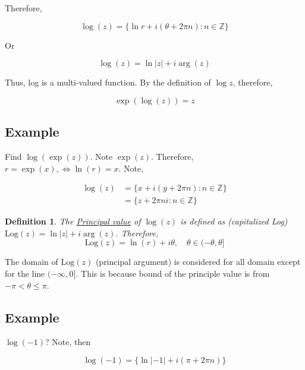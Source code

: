 \documentclass{article}
\newtheorem{definition}[theorem]{Definition}
\newtheorem{one minute paper}[theorem]{One Minute Paper}
\begin{document}
Therefore, 

\begin{equation}
    \log(z) = \{\ln r + i(\theta + 2\pi n) : n \in \mathbb{Z}\}
\end{equation}

Or 

\begin{equation}
    \log(z) = \ln|z| + i\arg(z)
\end{equation}

Thus, log is a multi-valued function. By the definition of $\log z$, therefore, 

\begin{equation}
    \exp(\log(z)) = z 
\end{equation}

\subsection*{Example}

Find $\log(\exp(z))$. Note $\exp(z)$. Therefore, $r = \exp(x), \iff \ln(r) = x$. Note, 

\begin{align}
    \log(z) &= \{x + i(y + 2\pi n): n \in \mathbb{Z}\} \\
    &= \{z + 2\pi n i: n \in \mathbb{Z}\}
\end{align}

\begin{definition}
    The \underline{Principal value} of $\log(z)$ is defined as (capitalized Log) $\text{Log}(z) = \ln|z| + i \arg(z)$. Therefore, 
    \begin{equation}
        \text{Log}(z) = \ln(r) + i\theta, \quad \theta \in (-\theta, \theta]
    \end{equation}
\end{definition}

The domain of $\text{Log}(z)$ (principal argument) is considered for all domain except for the line $(-\infty, 0]$. This is because bound of the principle value is from $-\pi < \theta \leq \pi$. 

\subsection*{Example}

$\log(-1)$? Note, then 

\begin{equation}
    \log(-1) = \{\ln|-1| + i(\pi + 2\pi n)\}
\end{equation}
\end{document}
